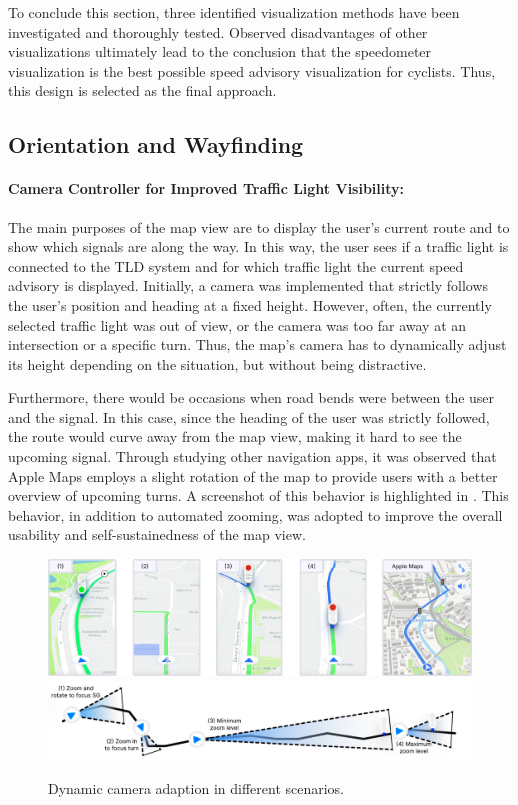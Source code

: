 To conclude this section, three identified visualization methods have been investigated and thoroughly tested. Observed disadvantages of other visualizations ultimately lead to the conclusion that the speedometer visualization is the best possible speed advisory visualization for cyclists. Thus, this design is selected as the final approach.

\subsection{Orientation and Wayfinding}

\paragraph{Camera Controller for Improved Traffic Light Visibility:} The main purposes of the map view are to display the user's current route and to show which signals are along the way. In this way, the user sees if a traffic light is connected to the TLD system and for which traffic light the current speed advisory is displayed. Initially, a camera was implemented that strictly follows the user's position and heading at a fixed height. However, often, the currently selected traffic light was out of view, or the camera was too far away at an intersection or a specific turn. Thus, the map's camera has to dynamically adjust its height depending on the situation, but without being distractive.

Furthermore, there would be occasions when road bends were between the user and the signal. In this case, since the heading of the user was strictly followed, the route would curve away from the map view, making it hard to see the upcoming signal. Through studying other navigation apps, it was observed that Apple Maps employs a slight rotation of the map to provide users with a better overview of upcoming turns. A screenshot of this behavior is highlighted in . This behavior, in addition to automated zooming, was adopted to improve the overall usability and self-sustainedness of the map view.

\begin{figure}[htbp]
\centering
\includegraphics[width=\linewidth]{images/camera-controller-1.png}
\includegraphics[width=\linewidth]{images/camera-controller-2.pdf}
\caption{Dynamic camera adaption in different scenarios.}
\label{fig:camera-controller}
\end{figure}

